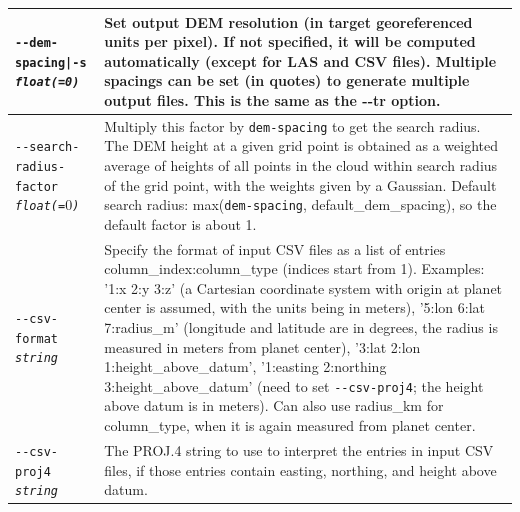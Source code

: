 \begin{longtable}{|p{8cm}|p{9cm}|}
\texttt{-\/-dem-spacing|-s \textit{float(=0)}} & Set output DEM resolution (in target georeferenced units per pixel). If not specified, it will be computed automatically (except for LAS and CSV files). Multiple spacings can be set (in quotes) to generate multiple output files. This is the same as the -\/-tr option. \\ \hline
\texttt{-\/-search-radius-factor \textit{float(=$0$)}} & Multiply this factor by \texttt{dem-spacing} to get the search radius. The DEM height at a given grid point is obtained as a weighted average of heights of all points in the cloud within search radius of the grid point, with the weights given by a Gaussian. Default search radius: max(\texttt{dem-spacing}, default\_dem\_spacing), so the default factor is about 1.\\ \hline

\texttt{-\/-csv-format \textit{string}} & Specify the format of input
CSV files as a list of entries column\_index:column\_type (indices start
from 1). Examples: '1:x 2:y 3:z' (a Cartesian coordinate system with
origin at planet center is assumed, with the units being in meters),
'5:lon 6:lat 7:radius\_m' (longitude and latitude are in degrees, the
radius is measured in meters from planet center), '3:lat 2:lon
1:height\_above\_datum', '1:easting 2:northing 3:height\_above\_datum'
(need to set \texttt{-\/-csv-proj4}; the height above datum is in
meters). Can also use radius\_km for column\_type, when it is again
measured from planet center. \\ \hline

\texttt{-\/-csv-proj4 \textit{string}} & The PROJ.4 string to use to
interpret the entries in input CSV files, if those entries contain
easting, northing, and height above datum. \\ \hline


\end{longtable}
